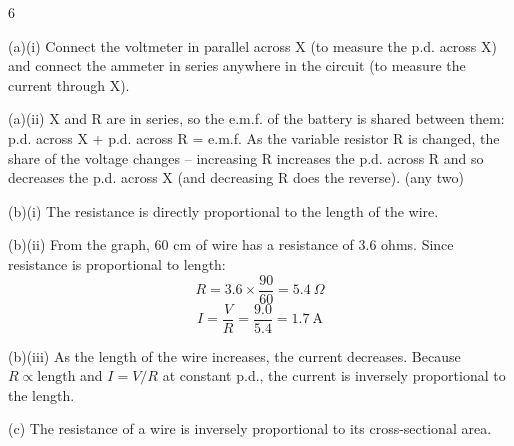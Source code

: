 \begin{question}{6}
\markscheme
{}
\endms

\exemplar
(a)(i) Connect the voltmeter in parallel across X (to measure the p.d. across X) and connect the ammeter in series anywhere in the circuit (to measure the current through X).

(a)(ii) X and R are in series, so the e.m.f. of the battery is shared between them: p.d. across X + p.d. across R = e.m.f. As the variable resistor R is changed, the share of the voltage changes -- increasing R increases the p.d. across R and so decreases the p.d. across X (and decreasing R does the reverse). (any two)

(b)(i) The resistance is directly proportional to the length of the wire.

(b)(ii) From the graph, 60 cm of wire has a resistance of 3.6 ohms. Since resistance is proportional to length:
$$ R = 3.6 \times \frac{90}{60} = 5.4\ \Omega $$
$$ I = \frac{V}{R} = \frac{9.0}{5.4} = 1.7\ \text{A} $$

(b)(iii) As the length of the wire increases, the current decreases. Because $R \propto \text{length}$ and $I = V/R$ at constant p.d., the current is inversely proportional to the length.

(c) The resistance of a wire is inversely proportional to its cross-sectional area.
\endexemplar
\end{question}

